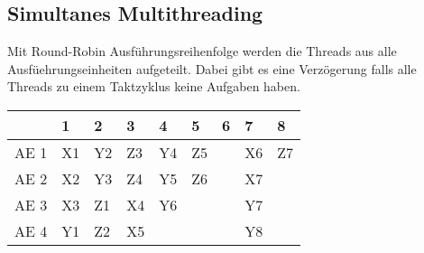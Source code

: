 \documentclass
[
	8pt,		%
	ngerman,	%
	a4paper,	%
	landscape,	%
	final		%
]{extarticle}
\begin{document}
\begin{multicols*}{4}
\subsection{Simultanes Multithreading} Mit Round-Robin Ausführungsreihenfolge
werden die Threads aus alle Ausfüehrungseinheiten aufgeteilt. Dabei gibt es eine
Verzögerung falls alle Threads zu einem Taktzyklus keine Aufgaben haben.\par
\begingroup\setlength\tabcolsep{2pt}
\small
\vspace{\abovedisplayskip}
\begin{tabularx}{\linewidth}{|c|XXXXXXXX|}\hline
	     & 1  & 2  & 3  & 4  & 5  & 6 & 7  & 8  \\\hline
	AE 1 & X1 & Y2 & Z3 & Y4 & Z5 &   & X6 & Z7 \\
	AE 2 & X2 & Y3 & Z4 & Y5 & Z6 &   & X7 &    \\
	AE 3 & X3 & Z1 & X4 & Y6 &    &   & Y7 &    \\
	AE 4 & Y1 & Z2 & X5 &    &    &   & Y8 &    \\\hline
\end{tabularx}
\endgroup
\end{multicols*}
\end{document}
